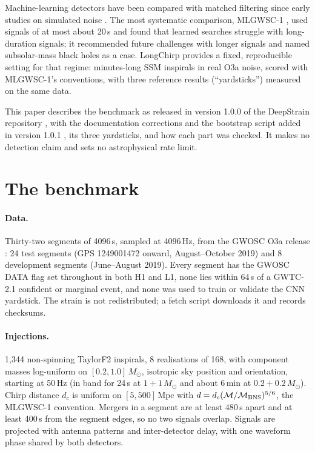 \documentclass[11pt]{article}
\newcommand{\Msun}{\ensuremath{M_\odot}}
\newcommand{\Mpc}{\ensuremath{\,\mathrm{Mpc}}}
\begin{document}
Machine-learning detectors have been compared with matched filtering since early studies on simulated noise
\cite{gabbard2018,george2018}. The most systematic comparison, MLGWSC-1 \cite{mlgwsc1}, used signals of at most about
20\,s and found that learned searches struggle with long-duration signals; it recommended future challenges with
longer signals and named subsolar-mass black holes as a case. LongChirp provides a fixed, reproducible setting for
that regime: minutes-long SSM inspirals in real O3a noise, scored with MLGWSC-1's conventions, with three reference
results (``yardsticks'') measured on the same data.

This paper describes the benchmark as released in version 1.0.0 of the DeepStrain repository \cite{deepstrain}, with
the documentation corrections and the bootstrap script added in version 1.0.1 \cite{deepstrain101}, its three
yardsticks, and how each part was checked. It makes no detection claim and sets no astrophysical rate limit.

\section{The benchmark}
\paragraph{Data.} Thirty-two segments of 4096\,s, sampled at 4096\,Hz, from the GWOSC O3a release \cite{gwosc_o3}:
24 test segments (GPS 1249001472 onward, August--October 2019) and 8 development segments (June--August 2019).
Every segment has the GWOSC DATA flag set throughout in both H1 and L1, none lies within 64\,s of a GWTC-2.1
confident or marginal event, and none was used to train or validate the CNN yardstick. The strain is not
redistributed; a fetch script downloads it and records checksums.

\paragraph{Injections.} 1,344 non-spinning TaylorF2 \cite{buonanno2009} inspirals, 8 realisations of 168, with
component masses log-uniform on $[0.2, 1.0]\,\Msun$, isotropic sky position and orientation, starting at 50\,Hz
(in band for 24\,s at $1+1\,\Msun$ and about 6\,min at $0.2+0.2\,\Msun$). Chirp distance $d_c$ is uniform on
$[5, 500]\Mpc$ with $d = d_c(\mathcal{M}/\mathcal{M}_{\rm BNS})^{5/6}$, the MLGWSC-1 convention. Mergers in a
segment are at least 480\,s apart and at least 400\,s from the segment edges, so no two signals overlap. Signals are
projected with antenna patterns and inter-detector delay, with one waveform phase shared by both detectors.
\end{document}
